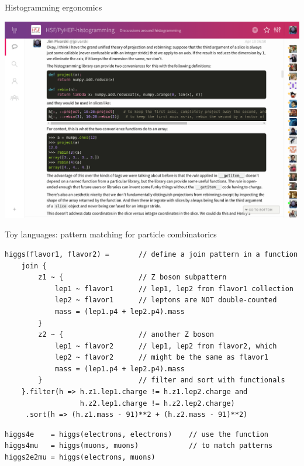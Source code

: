 \documentclass[aspectratio=169]{beamer}
\begin{document}
\begin{frame}{Histogramming ergonomics}
\vspace{-0.04 cm}

\begin{center}
\includegraphics[width=0.85\linewidth]{gitter-histogramming.png}
\end{center}
\end{frame}

\begin{frame}[fragile]{Toy languages: pattern matching for particle combinatorics}
\small
\begin{verbatim}
higgs(flavor1, flavor2) =       // define a join pattern in a function
    join {
        z1 ~ {                  // Z boson subpattern
            lep1 ~ flavor1      // lep1, lep2 from flavor1 collection
            lep2 ~ flavor1      // leptons are NOT double-counted
            mass = (lep1.p4 + lep2.p4).mass
        }
        z2 ~ {                  // another Z boson
            lep1 ~ flavor2      // lep1, lep2 from flavor2, which
            lep2 ~ flavor2      // might be the same as flavor1
            mass = (lep1.p4 + lep2.p4).mass
        }                       // filter and sort with functionals
    }.filter(h => h.z1.lep1.charge != h.z1.lep2.charge and
                  h.z2.lep1.charge != h.z2.lep2.charge)
     .sort(h => (h.z1.mass - 91)**2 + (h.z2.mass - 91)**2)
\end{verbatim}
\begin{verbatim}
higgs4e    = higgs(electrons, electrons)    // use the function
higgs4mu   = higgs(muons, muons)            // to match patterns
higgs2e2mu = higgs(electrons, muons)
\end{verbatim}
\end{frame}
\end{document}
